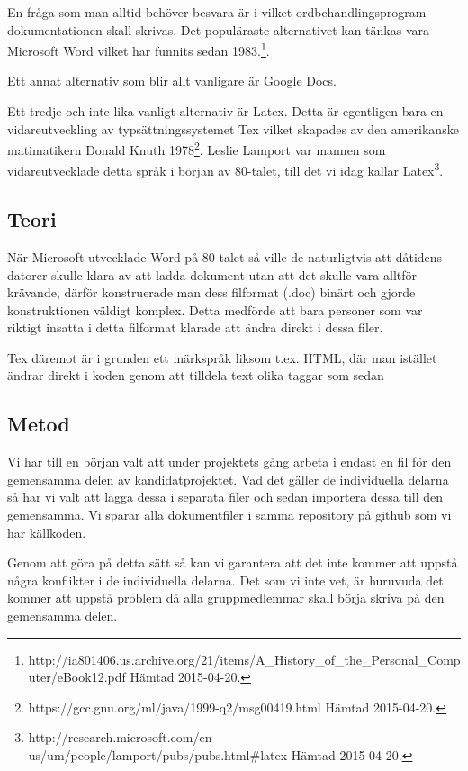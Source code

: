 En fråga som man alltid behöver besvara är i vilket ordbehandlingsprogram dokumentationen skall skrivas. Det populäraste 
alternativet kan tänkas vara Microsoft Word vilket har funnits sedan 1983.\footnote{http://ia801406.us.archive.org/21/items/A\_History\_of\_the\_Personal\_Computer/eBook12.pdf Hämtad 2015-04-20.}.

Ett annat alternativ som blir allt vanligare är Google Docs.

Ett tredje och inte lika vanligt alternativ är Latex. Detta är egentligen bara en vidareutveckling av typsättningssystemet 
Tex vilket skapades av den amerikanske matimatikern Donald Knuth 1978\footnote{https://gcc.gnu.org/ml/java/1999-q2/msg00419.html Hämtad 2015-04-20.}. Leslie Lamport var mannen som vidareutvecklade detta 
språk i början av 80-talet, till det vi idag kallar Latex\footnote{http://research.microsoft.com/en-us/um/people/lamport/pubs/pubs.html\#latex Hämtad 2015-04-20.}.




\subsection{Teori}
När Microsoft utvecklade Word på 80-talet så ville de naturligtvis att dåtidens datorer skulle klara av att ladda 
dokument utan att det skulle vara alltför krävande, därför konstruerade man dess filformat (.doc) binärt och gjorde konstruktionen 
väldigt komplex. Detta medförde att bara personer som var riktigt insatta i detta filformat klarade att ändra direkt i dessa filer.

Tex däremot är i grunden ett märkspråk liksom t.ex. HTML, där man istället ändrar direkt i koden genom att tilldela text olika taggar som sedan 

\subsection{Metod}
Vi har till en början valt att under projektets gång arbeta i endast en fil för den gemensamma delen av kandidatprojektet. Vad det gäller 
de individuella delarna så har vi valt att lägga dessa i separata filer och sedan importera dessa till den gemensamma. Vi 
sparar alla dokumentfiler i samma repository på github som vi har källkoden.

Genom att göra på detta sätt så kan vi garantera att det inte kommer att uppstå några konflikter i de individuella delarna.
Det som vi inte vet, är huruvuda det kommer att uppstå problem då alla gruppmedlemmar skall börja skriva på den gemensamma delen.

